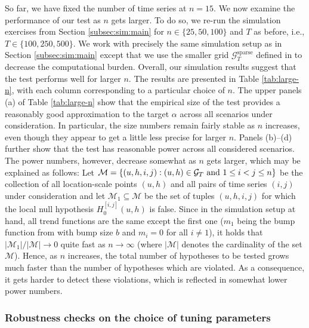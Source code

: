 \documentclass[12pt]{article}
\makeatletter
\renewcommand{\eqref}[1]{\tagform@{\ref{#1}}}
\makeatother
\begin{document}
So far, we have fixed the number of time series at $n = 15$. We now examine the performance of our test as $n$ gets larger. To do so, we re-run the simulation exercises from Section \ref{subsec:sim:main} for $n \in \{25,50,100\}$ and $T$ as before, i.e., $T \in \{100,250,500\}$. We work with precisely the same simulation setup as in Section \ref{subsec:sim:main} except that we use the smaller grid $\mathcal{G}_T^{\text{sparse}}$ defined in \eqref{eq:grid-sparse} to decrease the computational burden. Overall, our simulation results suggest that the test performs well for larger $n$. The results are presented in Table \ref{tab:large-n}, with each column corresponding to a particular choice of $n$. 
The upper panels (a) of Table \ref{tab:large-n} show that the empirical size of the test provides a reasonably good approximation to the target $\alpha$ across all scenarios under consideration. In particular, the size numbers remain fairly stable as $n$ increases, even though they appear to get a little less precise for larger $n$. 
Panels (b)--(d) further show that the test has reasonable power across all considered scenarios. The power numbers, however, decrease somewhat as $n$ gets larger, which may be explained as follows: Let $\mathcal{M} = \{ (u,h,i,j): (u,h) \in \mathcal{G}_T \text{ and } 1 \le i < j \le n \}$ be the collection of all location-scale points $(u,h)$ and all pairs of time series $(i,j)$ under consideration and let $\mathcal{M}_1 \subseteq \mathcal{M}$ be the set of tuples $(u,h,i,j)$ for which the local null hypothesis $H_0^{[i, j]}(u, h)$ is false. Since in the simulation setup at hand, all trend functions are the same except the first one ($m_1$ being the bump function from \eqref{eq:bump-fct} with bump size $b$ and $m_i = 0$ for all $i \ne 1$), it holds that $|\mathcal{M}_1| / |\mathcal{M}| \to 0$ quite fast as $n \to \infty$ (where $| \mathcal{M} |$ denotes the cardinality of the set $\mathcal{M}$). Hence, as $n$ increases, the total number of hypotheses to be tested grows much faster than the number of hypotheses which are violated. As a consequence, it gets harder to detect these violations, which is reflected in somewhat lower power numbers. 


\subsubsection{Robustness checks on the choice of tuning parameters}\label{subsec:sim:grid}
\end{document}
